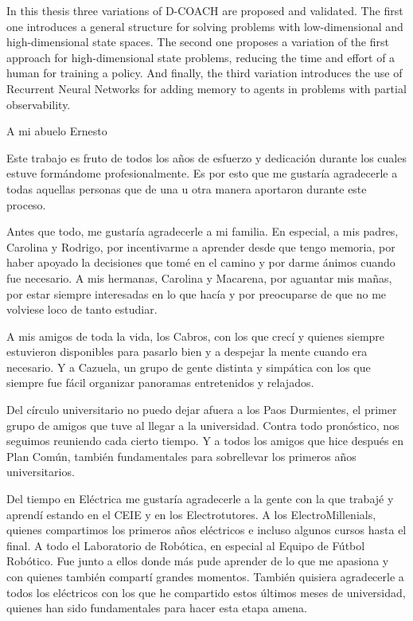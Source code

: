 \documentclass[upright, contnum]{umemoria}
\begin{document}
\begin{abstract_eng}
In this thesis three variations of D-COACH are proposed and validated. The first one introduces a general structure for solving problems with low-dimensional and high-dimensional state spaces. The second one proposes a variation of the first approach for high-dimensional state problems, reducing the time and effort of a human for training a policy. And finally, the third variation introduces the use of Recurrent Neural Networks for adding memory to agents in problems with partial observability.
\end{abstract_eng}


\begin{dedicatoria}
A mi abuelo Ernesto
\end{dedicatoria}

\begin{thanks}
Este trabajo es fruto de todos los años de esfuerzo y dedicación durante los cuales estuve formándome profesionalmente. Es por esto que me gustaría agradecerle a todas aquellas personas que de una u otra manera aportaron durante este proceso.

Antes que todo, me gustaría agradecerle a mi familia. En especial, a mis padres, Carolina y Rodrigo, por incentivarme a aprender desde que tengo memoria, por haber apoyado la decisiones que tomé en el camino y por darme ánimos cuando fue necesario. A mis hermanas, Carolina y Macarena, por aguantar mis mañas, por estar siempre interesadas en lo que hacía y por preocuparse de que no me volviese loco de tanto estudiar.

A mis amigos de toda la vida, los Cabros, con los que crecí y quienes siempre estuvieron disponibles para pasarlo bien y a despejar la mente cuando era necesario. Y a Cazuela, un grupo de gente distinta y simpática con los que siempre fue fácil organizar panoramas entretenidos y relajados.

Del círculo universitario no puedo dejar afuera a los Paos Durmientes, el primer grupo de amigos que tuve al llegar a la universidad. Contra todo pronóstico, nos seguimos reuniendo cada cierto tiempo. Y a todos los amigos que hice después en Plan Común, también fundamentales para sobrellevar los primeros años universitarios.

Del tiempo en Eléctrica me gustaría agradecerle a la gente con la que trabajé y aprendí estando en el CEIE y en los Electrotutores. A los ElectroMillenials, quienes compartimos los primeros años eléctricos e incluso algunos cursos hasta el final. A todo el Laboratorio de Robótica, en especial al Equipo de Fútbol Robótico. Fue junto a ellos donde más pude aprender de lo que me apasiona y con quienes también compartí grandes momentos. También quisiera agradecerle a todos los eléctricos con los que he compartido estos últimos meses de universidad, quienes han sido fundamentales para hacer esta etapa amena.


\end{thanks}
\end{document}

